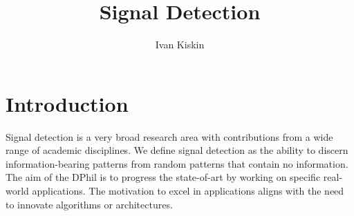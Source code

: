 \documentclass[12pt]{llncs}
\begin{document}
%


%
\pagestyle{headings}  %

%
\mainmatter              %


\title{Signal Detection}
%

%
\author{Ivan Kiskin}
%
%
%


\maketitle              %




\section{Introduction}

Signal detection is a very broad research area with contributions from a wide range of academic disciplines. We define signal detection as the ability to discern information-bearing patterns from random patterns that contain no information. The aim of the DPhil is to progress the state-of-art by working on specific real-world applications.  The motivation to excel in applications aligns with the need to innovate algorithms or architectures.
\end{document}
